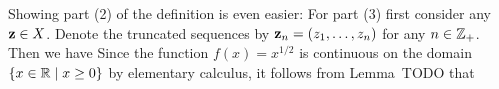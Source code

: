 {{    Showing part (2) of the definition is even easier:
    For part (3) first consider any $\mathbf{z} \in X$.
    Denote the truncated sequences by $\mathbf{z}_n = (z_1, \ldots, z_n)$ for any $n \in {{\mathbb{Z}}_+}$.
    Then we have
    Since the function $f(x) = x^{1/2}$ is continuous on the domain $\left\{ x \in {\mathbb{R}} \mid x \geq 0 \right\}$ by elementary calculus, it follows from Lemma~TODO that
  }
}
